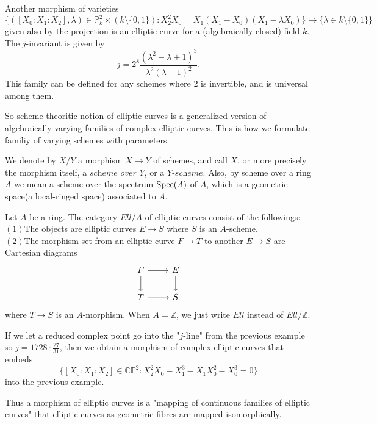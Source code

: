 \documentclass[a4paper,11pt]{article}
\begin{document}
\begin{exm}\label{Leg}
Another morphism of varieties
\[
\{([X_0:X_1:X_2],\lambda) \in \mathbb{P}_{k}^2\times (k\setminus\{ 0,1\}):X_2^2X_0=X_1(X_1-X_0)(X_1-\lambda X_0)\} \to \{\lambda\in k \setminus\{ 0,1\}\}
\]
given also by the projection is an elliptic curve for a (algebraically closed) field $k$.
The $j$-invariant is given by
\[
j=2^8\frac{(\lambda^2-\lambda+1)^3}{\lambda^2(\lambda-1)^2}.
\]
This family can be defined for any schemes where $2$ is invertible, and is universal among them.
\end{exm}

So scheme-theoritic notion of elliptic curves is a generalized version of algebraically varying families of complex elliptic curves.
This is how we formulate familiy of varying schemes with parameters.

\begin{nota}
We denote by $X/Y$ a morphism $X\to$$Y$ of schemes, and call $X$, or more precisely the morphism itself, a $\textit{scheme over }Y$, or a $Y\textit{-scheme}$.
Also, by scheme over a ring $A$ we mean a scheme over the spectrum $\textnormal{Spec}(A)$ of $A$, which is a geometric space(a local-ringed space) associated to $A$.
\end{nota}

\begin{defn}
Let $A$ be a ring.
The category $Ell/A$ of elliptic curves consist of the followings:\\
$(1)$The objects are elliptic curves $E\to$$S$ where $S$ is an $A$-scheme.\\
$(2)$The morphism set from an elliptic curve $F\to$$T$ to another $E\to$$S$ are Cartesian diagrams
\[
\begin{tikzcd}
F \arrow[r] \arrow[d] & E \arrow[d] \\
T \arrow[r] & S
\end{tikzcd}
\]
where $T\to$$S$ is an $A$-morphism.
When $A=\mathbb{Z}$, we just write $Ell$ instead of $Ell/\mathbb{Z}$.
\end{defn}

\begin{exm}
If we let a reduced complex point go into the "$j$-line" from the previous example so $j=1728\cdot\frac{27}{31}$, then we obtain a morphism of complex elliptic curves that embeds
\[
\{[X_0:X_1:X_2] \in \mathbb{CP}^2 : X_2^2X_0-X_1^3-X_1X_0^2-X_0^3=0\}
\]
into the previous example.
\end{exm}
Thus a morphism of elliptic curves is a "mapping of continuous families of elliptic curves" that elliptic curves as geometric fibres are mapped isomorphically.
\end{document}
